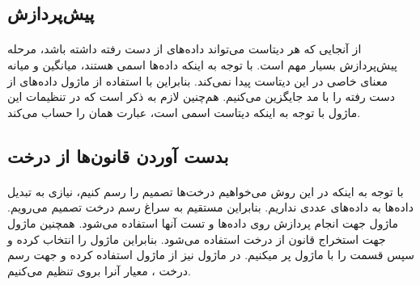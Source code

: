 \documentclass[a4paper,12pt]{article}
\begin{document}
\subsection{پیش‌پردازش}
\paragraph{}
از آنجایی که هر دیتاست می‌تواند داده‌های از دست رفته داشته باشد، مرحله پیش‌پردازش بسیار مهم است. با توجه به اینکه داده‌ها اسمی هستند، میانگین و میانه معنای خاصی در این دیتاست پیدا نمی‌کند. بنابراین با استفاده از ماژول  داده‌های از دست رفته را با مد جایگزین می‌کنیم. هم‌چنین لازم به ذکر است که در تنظیمات این ماژول با توجه به اینکه دیتاست اسمی است، عبارت  همان  را حساب می‌کند.

\subsection{بدست آوردن قانون‌ها از درخت }
\paragraph{}
با توجه به اینکه در این روش می‌خواهیم درخت‌ها تصمیم را رسم کنیم، نیازی به تبدیل داده‌ها به داده‌های عددی نداریم. بنابراین مستقیم به سراغ رسم درخت تصمیم می‌رویم. ماژول  جهت انجام پردازش روی داده‌ها و تست آنها استفاده می‌شود. همچنین ماژول  جهت استخراج قانون از درخت استفاده می‌شود. بنابراین ماژول  را انتخاب کرده و سپس قسمت  را با ماژول  پر میکنیم. در ماژول   نیز از ماژول  استفاده کرده و جهت رسم درخت ، معیار آنرا بروی  تنظیم می‌کنیم.
\end{document}
